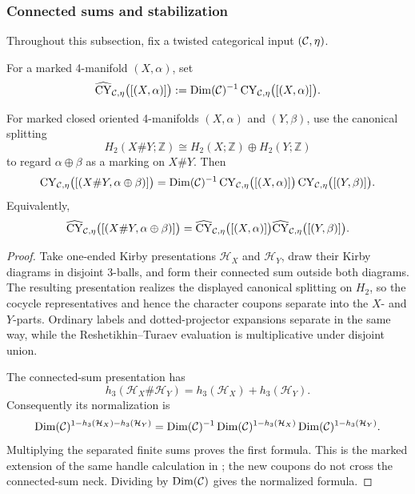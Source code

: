 \subsubsection{Connected sums and stabilization}
\label{subsec:connected-sums}

Throughout this subsection, fix a twisted categorical input \((\mathcal{C},\eta)\).

\begin{definition}
\label{def:normalized-invariant}
For a marked 4-manifold \((X,\alpha)\), set
\[
  \widehat{\operatorname{CY}}_{\mathcal{C},\eta}\bigl([(X,\alpha)]\bigr)
  :=\operatorname{Dim}(\mathcal{C})^{-1}
    \operatorname{CY}_{\mathcal{C},\eta}\bigl([(X,\alpha)]\bigr).
\]
\end{definition}

\begin{proposition}
\label{prop:connected-sum-formula}
For marked closed oriented 4-manifolds $(X,\alpha)$ and $(Y,\beta)$,
use the canonical splitting
\[
  H_2(X\#Y;\mathbb Z)
  \cong H_2(X;\mathbb Z)\oplus H_2(Y;\mathbb Z)
\]
to regard $\alpha\oplus\beta$ as a marking on $X\#Y$.  Then
\[
  \operatorname{CY}_{\mathcal{C},\eta}\bigl([(X\#Y,\alpha\oplus\beta)]\bigr)
  =\operatorname{Dim}(\mathcal{C})^{-1}
   \operatorname{CY}_{\mathcal{C},\eta}\bigl([(X,\alpha)]\bigr)
   \operatorname{CY}_{\mathcal{C},\eta}\bigl([(Y,\beta)]\bigr).
\]
Equivalently,
\[
  \widehat{\operatorname{CY}}_{\mathcal{C},\eta}\bigl([(X\#Y,\alpha\oplus\beta)]\bigr)
  =\widehat{\operatorname{CY}}_{\mathcal{C},\eta}\bigl([(X,\alpha)]\bigr)
   \widehat{\operatorname{CY}}_{\mathcal{C},\eta}\bigl([(Y,\beta)]\bigr).
\]
\end{proposition}

\begin{proof}
Take one-ended Kirby presentations $\mathcal H_X$ and $\mathcal H_Y$, draw
their Kirby diagrams in disjoint $3$-balls, and form their connected sum
outside both diagrams.  The resulting presentation realizes the displayed
canonical splitting on $H_2$, so the cocycle representatives and hence the
character coupons separate into the $X$- and $Y$-parts.  Ordinary labels
and dotted-projector expansions separate in the same way, while the
Reshetikhin--Turaev evaluation is multiplicative under disjoint union.

The connected-sum presentation has
\[
  h_3(\mathcal H_X\#\mathcal H_Y)
  =h_3(\mathcal H_X)+h_3(\mathcal H_Y).
\]
Consequently its normalization is
\[
  \operatorname{Dim}(\mathcal{C})^{1-h_3(\mathcal H_X)-h_3(\mathcal H_Y)}
  =\operatorname{Dim}(\mathcal{C})^{-1}
   \operatorname{Dim}(\mathcal{C})^{1-h_3(\mathcal H_X)}
   \operatorname{Dim}(\mathcal{C})^{1-h_3(\mathcal H_Y)}.
\]
Multiplying the separated finite sums proves the first formula.  This is
the marked extension of the same handle calculation in
\cite[Proposition~5.14]{Tham2021}; the new coupons do not cross the
connected-sum neck.  Dividing by $\operatorname{Dim}(\mathcal{C})$ gives the
normalized formula.
\end{proof}


